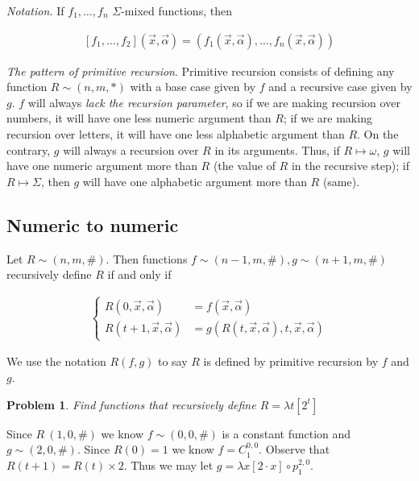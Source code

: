 \documentclass[a4paper, 12pt]{article}
\newtheorem{problem}{Problem}
\newtheorem{problem}{Problem}
\begin{document}
\textit{Notation.} If $f_1, \ldots, f_n$ $\Sigma$-mixed functions, then 

\begin{align*}
    \left[ f_1, \ldots, f_2 \right](\overrightarrow{x}, \overrightarrow{\alpha})
    = \left( f_1(\overrightarrow{x}, \overrightarrow{\alpha}), \ldots,
    f_n(\overrightarrow{x}, \overrightarrow{\alpha}) \right) 
\end{align*}


\textit{The pattern of primitive recursion}. Primitive recursion consists of
defining any function $R \sim (n, m, *)$ with a base case given by $f$ and a
recursive case given by $g$. $f$ will always \textit{lack the recursion
parameter}, so if we are making recursion over numbers, it will have one less
numeric argument than $R$; if we are making recursion over letters, it will have
one less alphabetic argument than $R$. On the contrary, $g$ will always a
recursion over $R$ in its arguments. Thus, if $R \mapsto \omega$, $g$ will have
one numeric argument more than $R$ (the value of $R$ in the recursive step); if
$R \mapsto \Sigma$, then $g$ will have one alphabetic argument more than $R$
(same).

\subsection{Numeric to numeric}

Let $R \sim (n, m, \#)$. Then functions $f \sim (n - 1, m, \#), g \sim (n + 1,
m, \#)$ recursively define $R$ if and only if 

\begin{align*}
\begin{cases}
    R(0, \overrightarrow{x}, \overrightarrow{\alpha}) &= f(
        \overrightarrow{x}, \overrightarrow{\alpha}) \\
    R(t + 1, \overrightarrow{x}, \overrightarrow{\alpha}) &= g \left( R(t,
        \overrightarrow{x}, \overrightarrow{\alpha}), t, \overrightarrow{x},
    \overrightarrow{\alpha} \right)
\end{cases}
\end{align*}

We use the notation $R(f, g)$ to say $R$ is defined by primitive recursion by
$f$ and $g$.


\begin{problem}
    Find functions that recursively define $R = \lambda t \left[ 2^t \right] $
\end{problem}

Since $R ~ (1, 0, \#)$ we know $f \sim (0, 0, \#)$ is a constant function and $g
\sim (2, 0, \#)$. Since $R(0) = 1$ we know $f = C_{1}^{0, 0}$. Observe that $R(t
+ 1) = R(t) \times 2$. Thus we may let $g = \lambda x [2 \cdot x] \circ
p_{1}^{2, 0}$. 
\end{document}
